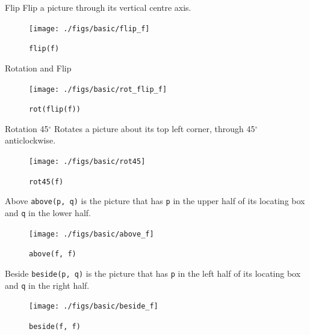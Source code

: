 \documentclass{beamer}
\begin{document}
    \begin{frame}{Flip}
    	Flip a picture through its vertical centre axis.

        \begin{figure}
            \centering
            \texttt{[image: ./figs/basic/flip\_f]}
            \caption{\texttt{flip(f)}}
            \label{fig:flip_f}
        \end{figure}
    \end{frame}

    \begin{frame}{Rotation and Flip}

        \begin{figure}
            \centering
            \texttt{[image: ./figs/basic/rot\_flip\_f]}
            \caption{\texttt{rot(flip(f))}}
            \label{fig:rot_flip_f}
        \end{figure}
    \end{frame}

    \begin{frame}{Rotation 45$^{\circ}$}
    	Rotates a picture about its top left corner, through 45$^{\circ}$ anticlockwise.

        \begin{figure}
            \centering
            \texttt{[image: ./figs/basic/rot45]}
            \caption{\texttt{rot45(f)}}
            \label{fig:rot45}
        \end{figure}
    \end{frame}

    \begin{frame}{Above}
        \texttt{above(p, q)} is the picture that has \texttt{p} in the upper half
        of its locating box and \texttt{q} in the lower half.

        \begin{figure}
            \centering
            \texttt{[image: ./figs/basic/above\_f]}
            \caption{\texttt{above(f, f)}}
            \label{fig:above}
        \end{figure}
    \end{frame}

    \begin{frame}{Beside}
        \texttt{beside(p, q)} is the picture that has \texttt{p} in the left half
        of its locating box and \texttt{q} in the right half.

        \begin{figure}
            \centering
            \texttt{[image: ./figs/basic/beside\_f]}
            \caption{\texttt{beside(f, f)}}
            \label{fig:beside}
        \end{figure}
    \end{frame}
\end{document}
